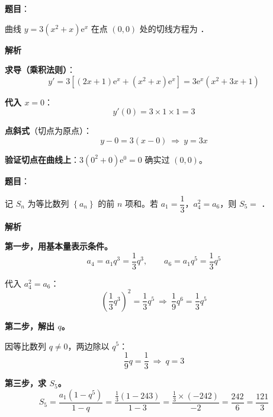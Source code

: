 \begin{answer}

\textbf{题目}：

曲线 $y=3\left(x^{2}+x\right)\mathrm e^{x}$ 在点 $(0,0)$ 处的切线方程为 \gkblank{}．

\textbf{解析}

\textbf{求导（乘积法则）}：
\nopagebreak[4]
\[y'=3\left[(2x+1)\mathrm e^{x}+\left(x^{2}+x\right)\mathrm e^{x}\right]=3\mathrm e^{x}\left(x^{2}+3x+1\right)\]

\textbf{代入 $x=0$}：
\nopagebreak[4]
\[y'(0)=3\times1\times1=3\]

\textbf{点斜式}（切点为原点）：
\nopagebreak[4]
\[y-0=3(x-0)\ \Longrightarrow\ y=3x\]

\begin{gktip}
\textbf{验证切点在曲线上}：$3\left(0^{2}+0\right)\mathrm e^{0}=0$  确实过 $(0,0)$。
\end{gktip}


\par\medskip

\end{answer}
\begin{answer}

\textbf{题目}：

记 $S_n$ 为等比数列 $\left\{a_n\right\}$ 的前 $n$ 项和。若 $a_1=\dfrac13$，$a_4^{2}=a_6$，则 $S_5=$ \gkblank{}．

\textbf{解析}

\textbf{第一步，用基本量表示条件。}
\nopagebreak[4]
\[a_4=a_1q^{3}=\frac13q^{3},\qquad a_6=a_1q^{5}=\frac13q^{5}\]

代入 $a_4^{2}=a_6$：
\nopagebreak[4]
\[\left(\frac13q^{3}\right)^{2}=\frac13q^{5}\ \Longrightarrow\ \frac19q^{6}=\frac13q^{5}\]

\textbf{第二步，解出 $q$。}

因等比数列 $q\ne0$，两边除以 $q^{5}$：
\nopagebreak[4]
\[\frac19q=\frac13\ \Longrightarrow\ q=3\]

\textbf{第三步，求 $S_5$。}
\nopagebreak[4]
\[S_5=\frac{a_1\left(1-q^{5}\right)}{1-q}=\frac{\frac13\left(1-243\right)}{1-3}=\frac{\frac13\times(-242)}{-2}=\frac{242}6=\frac{121}3\]


\par\medskip

\end{answer}
